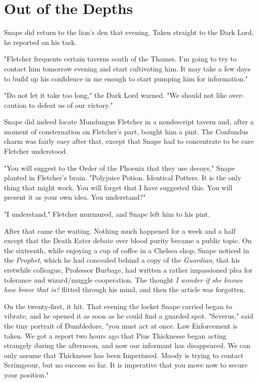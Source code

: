 
\chapter{Out of the Depths}

Snape did return to the lion's den that evening. Taken straight to the Dark Lord, he reported on his task.

"Fletcher frequents certain taverns south of the Thames. I'm going to try to contact him tomorrow evening and start cultivating him. It may take a few days to build up his confidence in me enough to start pumping him for information."

"Do not let it take too long," the Dark Lord warned. "We should not like over-caution to defeat us of our victory."

Snape did indeed locate Mundungus Fletcher in a nondescript tavern and, after a moment of consternation on Fletcher's part, bought him a pint. The Confundus charm was fairly easy after that, except that Snape had to concentrate to be sure Fletcher understood.

"You will suggest to the Order of the Phoenix that they use decoys," Snape planted in Fletcher's brain. "Polyjuice Potion. Identical Potters. It is the only thing that might work. You will forget that I have suggested this. You will present it as your own idea. You understand?"

"I understand," Fletcher murmured, and Snape left him to his pint.

After that came the waiting. Nothing much happened for a week and a half except that the Death Eater debate over blood purity became a public topic. On the sixteenth, while enjoying a cup of coffee in a Chelsea shop, Snape noticed in the \emph{Prophet}, which he had concealed behind a copy of the \emph{Guardian}, that his erstwhile colleague, Professor Burbage, had written a rather impassioned plea for tolerance and wizard\slash muggle cooperation. The thought \emph{I wonder if she knows how brave that is?} flitted through his mind, and then the article was forgotten.

On the twenty-first, it hit. That evening the locket Snape carried began to vibrate, and he opened it as soon as he could find a guarded spot. "Severus," said the tiny portrait of Dumbledore, "you must act at once. Law Enforcement is taken. We got a report two hours ago that Pius Thicknesse began acting strangely during the afternoon, and now our informant has disappeared. We can only assume that Thicknesse has been Imperiused. Moody is trying to contact Scrimgeour, but no success so far. It is imperative that you move now to secure your position."

